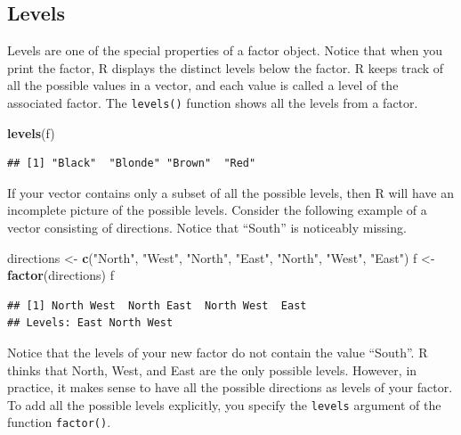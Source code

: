 \documentclass[
]{book}
\newenvironment{Shaded}{\begin{snugshade}}{\end{snugshade}}
\newcommand{\KeywordTok}[1]{\textcolor[rgb]{0.13,0.29,0.53}{\textbf{#1}}}
\newcommand{\NormalTok}[1]{#1}
\newcommand{\StringTok}[1]{\textcolor[rgb]{0.31,0.60,0.02}{#1}}
\begin{document}
\hypertarget{levels}{%
\subsection{Levels}\label{levels}}

Levels are one of the special properties of a factor object. Notice that when you print the factor, R displays the distinct levels below the factor. R keeps track of all the possible values in a vector, and each value is called a level of the associated factor. The \texttt{levels()} function shows all the levels from a factor.

\begin{Shaded}
\begin{Highlighting}[]
\KeywordTok{levels}\NormalTok{(f)}
\end{Highlighting}
\end{Shaded}

\begin{verbatim}
## [1] "Black"  "Blonde" "Brown"  "Red"
\end{verbatim}

If your vector contains only a subset of all the possible levels, then R will have an incomplete picture of the possible levels. Consider the following example of a vector consisting of directions. Notice that ``South'' is noticeably missing.

\begin{Shaded}
\begin{Highlighting}[]
\NormalTok{directions <-}\StringTok{ }\KeywordTok{c}\NormalTok{(}\StringTok{"North"}\NormalTok{, }\StringTok{"West"}\NormalTok{, }\StringTok{"North"}\NormalTok{, }\StringTok{"East"}\NormalTok{, }\StringTok{"North"}\NormalTok{, }\StringTok{"West"}\NormalTok{,}
    \StringTok{"East"}\NormalTok{)}
\NormalTok{f <-}\StringTok{ }\KeywordTok{factor}\NormalTok{(directions)}
\NormalTok{f}
\end{Highlighting}
\end{Shaded}

\begin{verbatim}
## [1] North West  North East  North West  East 
## Levels: East North West
\end{verbatim}

Notice that the levels of your new factor do not contain the value ``South''. R thinks that North, West, and East are the only possible levels. However, in practice, it makes sense to have all the possible directions as levels of your factor. To add all the possible levels explicitly, you specify the \texttt{levels} argument of the function \texttt{factor()}.
\end{document}
